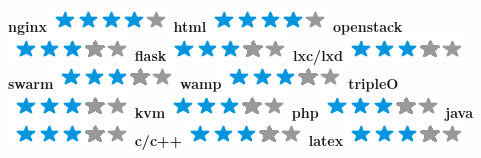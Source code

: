 \documentclass[]{friggeri-cv}
\begin{document}
\begin{aside}
        \textbf{nginx}\includegraphics[scale=0.40]{img/4stars.png}
        \textbf{html}\includegraphics[scale=0.40]{img/4stars.png}
        \textbf{openstack}\includegraphics[scale=0.40]{img/3stars.png}
        \textbf{flask}\includegraphics[scale=0.40]{img/3stars.png}
        \textbf{lxc/lxd}\includegraphics[scale=0.40]{img/3stars.png}
        \textbf{swarm}\includegraphics[scale=0.40]{img/3stars.png}
        \textbf{wamp}\includegraphics[scale=0.40]{img/3stars.png}
        \textbf{tripleO}\includegraphics[scale=0.40]{img/3stars.png}
        \textbf{kvm}\includegraphics[scale=0.40]{img/3stars.png}
        \textbf{php}\includegraphics[scale=0.40]{img/3stars.png}
        \textbf{java}\includegraphics[scale=0.40]{img/3stars.png}
        \textbf{c/c++}\includegraphics[scale=0.40]{img/3stars.png}
        \textbf{latex}\includegraphics[scale=0.40]{img/3stars.png}

\end{aside}
\end{document}
